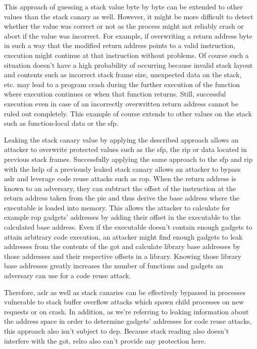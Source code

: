This approach of guessing a stack value byte by byte can be extended to other values than the stack canary as well.
However, it might be more difficult to detect whether the value was correct or not as the process might not reliably crash or abort if the value was incorrect.
For example, if overwriting a return address byte in such a way that the modified return address points to a valid instruction, execution might continue at that instruction without problems.
Of course such a situation doesn't have a high probability of occurring because invalid stack layout and contents such as incorrect stack frame size, unexpected data on the stack, etc. may lead to a program crash during the further execution of the function where execution continues or when that function returns.
Still, successful execution even in case of an incorrectly overwritten return address cannot be ruled out completely.
This example of course extends to other values on the stack such as function-local data or the \gls{sfp}.

Leaking the stack canary value by applying the described approach allows an attacker to overwrite protected values such as the \gls{sfp}, the \gls{rip} or data located in previous stack frames.
Successfully applying the same approach to the \gls{sfp} and \gls{rip} with the help of a previously leaked stack canary allows an attacker to bypass \gls{aslr} and leverage code reuse attacks such as \gls{rop}.
When the return address is known to an adversary, they can subtract the offset of the instruction at the return address taken from the \gls{pie} and thus derive the base address where the executable is loaded into memory.
This allows the attacker to calculate for example \gls{rop} gadgets' addresses by adding their offset in the executable to the calculated base address.
Even if the executable doesn't contain enough gadgets to attain arbitrary code execution, an attacker might find enough gadgets to leak addresses from the contents of the \gls{got} and calculate library base addresses by those addresses and their respective offsets in a library.
Knowing those library base addresses greatly increases the number of functions and gadgets an adversary can use for a code reuse attack.

Therefore, \gls{aslr} as well as stack canaries can be effectively bypassed in processes vulnerable to stack buffer overflow attacks which spawn child processes on new requests or on crash.
In addition, as we're referring to leaking information about the address space in order to determine gadgets' addresses for code reuse attacks, this approach also isn't subject to \gls{dep}.
Because stack reading also doesn't interfere with the \gls{got}, \gls{relro} also can't provide any protection here.

